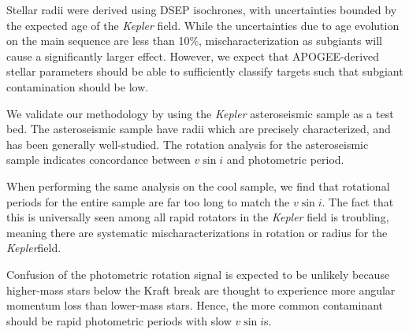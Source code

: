 \documentclass[manuscript]{aastex6}
\newcommand{\vsini}{\ensuremath{v \sin i}}
\newcommand{\Kepler}{\mbox{\textit{Kepler}}}
\begin{document}
Stellar radii were derived using DSEP isochrones, with uncertainties bounded by
the expected age of the \Kepler{} field. While the uncertainties due to age
evolution on the main sequence are less than 10\%, mischaracterization as
subgiants will cause a significantly larger effect. However, we expect that
APOGEE-derived stellar parameters should be able to sufficiently classify
targets such that subgiant contamination should be low.

We validate our methodology by using the \Kepler{} asteroseismic sample as a
test bed. The asteroseismic sample have radii which are precisely
characterized, and has been generally well-studied. The rotation analysis for
the asteroseismic sample indicates concordance between \vsini{} and photometric
period.

When performing the same analysis on the cool sample, we find that rotational
periods for the entire sample are far too long to match the \vsini{}. The fact
that this is universally seen among all rapid rotators in the \Kepler{} field
is troubling, meaning there are systematic mischaracterizations in rotation or
radius for the \Kepler field.

Confusion of the photometric rotation signal is expected to be unlikely because
higher-mass stars below the Kraft break are thought to experience more angular
momentum loss than lower-mass stars. Hence, the more common contaminant should
be rapid photometric periods with slow \vsini{}s.





\end{document}
